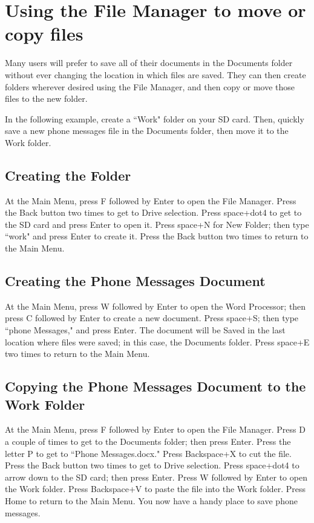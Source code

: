 \documentclass[10pt,letterpaper,twoside]{report}
\begin{document}
{{{\section{Using the File Manager to move or copy files}

Many users will prefer to save all of their documents in the Documents folder without ever changing the location in which files are saved. They can then create folders wherever desired using the File Manager, and then copy or move those files to the new folder.

In the following example, create a ``Work" folder on your SD card. Then, quickly save a new phone messages file in the Documents folder, then move it to the Work folder.

\subsection{Creating the Folder}

At the Main Menu, press F followed by Enter to open the File Manager.
Press the Back button two times to get to Drive selection.
Press space+dot4 to get to the SD card and press Enter to open it.
Press space+N for New Folder; then type ``work" and press Enter to create it.
Press the Back button two times to return to the Main Menu.

\subsection{Creating the Phone Messages Document}

At the Main Menu, press W followed by Enter to open the Word Processor; then press C followed by Enter to create a new document.
Press space+S; then type ``phone Messages," and press Enter. The document will be Saved in the last location where files were saved; in this case, the Documents folder.
Press space+E two times to return to the Main Menu.

\subsection{Copying the Phone Messages Document to the Work Folder}

At the Main Menu, press F followed by Enter to open the File Manager.
Press D a couple of times to get to the Documents folder; then press Enter.
Press the letter P to get to ``Phone Messages.docx."
Press Backspace+X to cut the file.
Press the Back button two times to get to Drive selection.
Press space+dot4 to arrow down to the SD card; then press Enter.
Press W followed by Enter to open the Work folder.
Press Backspace+V to paste the file into the Work folder.
Press Home to return to the Main Menu.
You now have a handy place to save phone messages.

}}}
\end{document}
